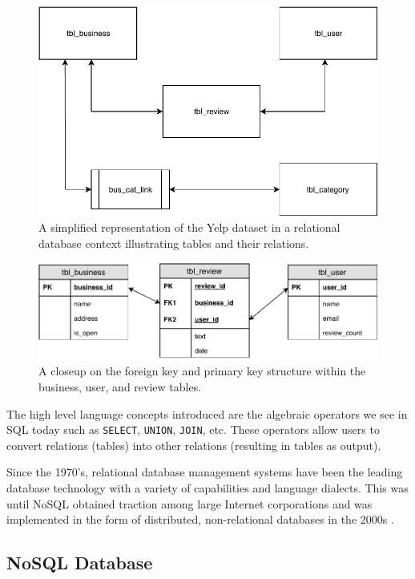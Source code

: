 \begin{figure}[h!]
    \centering
    \includegraphics[width=12cm]{img/relational-database.pdf}
    \caption{A simplified representation of the Yelp dataset in a relational database context illustrating tables and their relations.}
    \label{fig:relational-database}
\end{figure}

\begin{figure}[h!]
    \centering
    \includegraphics[width=13cm]{img/foreign-key.pdf}
    \caption{A closeup on the foreign key and primary key structure within the business, user, and review tables.}
    \label{fig:foreign-key}
\end{figure}

The high level language concepts introduced are the algebraic operators we see in SQL today such as \verb|SELECT|, \verb|UNION|, \verb|JOIN|, etc. These operators allow users to convert relations (tables) into other relations (resulting in tables as output).

Since the 1970's, relational database management systems have been the leading database technology with a variety of capabilities and language dialects. This was until NoSQL obtained traction among large Internet corporations and was implemented in the form of distributed, non-relational databases in the 2000s \cite{data-in-nosql}.

\subsection{NoSQL Database}
\label{nosql-database}

